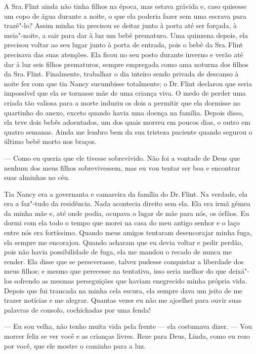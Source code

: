 A Sra.\,Flint ainda não tinha filhos na
época, mas estava grávida e, caso quisesse um copo de água durante a
noite, o que ela poderia fazer sem uma escrava para trazê"-lo? Assim
minha tia precisou se deitar junto à porta até ser forçada, à
meia"-noite, a sair para dar à luz um bebê prematuro. Uma quinzena
depois, ela precisou voltar ao seu lugar junto à porta de entrada, pois
o bebê da Sra.\,Flint precisava das suas atenções. Ela ficou no seu posto
durante inverno e verão até dar à luz seis filhos prematuros, sempre
empregada como ama noturna dos filhos da Sra.\,Flint. Finalmente,
trabalhar o dia inteiro sendo privada de descanso à noite fez com que
tia Nancy sucumbisse totalmente; o Dr.\,Flint declarou que seria
impossível que ela se tornasse mãe de uma criança viva. O medo de perder
uma criada tão valiosa para a morte induziu os dois a permitir que ela
dormisse no quartinho do anexo, exceto quando havia uma doença na
família. Depois disso, ela teve dois bebês adoentados, um dos quais
morreu em poucos dias, o outro em quatro semanas. Ainda me lembro bem da
sua tristeza paciente quando segurou o último bebê morto nos braços.

--- Como eu queria que ele tivesse sobrevivido. Não foi a vontade de
Deus que nenhum dos meus filhos sobrevivessem, mas eu vou tentar ser boa
e encontrar suas alminhas no céu.

Tia Nancy era a governanta e camareira
da família do Dr.\,Flint. Na verdade, ela era a faz"-tudo da residência.
Nada acontecia direito sem ela. Ela era irmã gêmea da minha mãe e, até
onde podia, ocupava o lugar de mãe para nós, os órfãos. Eu dormi com ela
todo o tempo que morei na casa do meu antigo senhor e o laço entre nós
era fortíssimo. Quando meus amigos tentaram desencorajar minha fuga, ela
sempre me encorajou. Quando acharam que eu devia voltar e pedir perdão,
pois não havia possibilidade de fuga, ela me mandou o recado de nunca me
render. Ela disse que se perseverasse, talvez pudesse conquistar a
liberdade dos meus filhos; e mesmo que perecesse na tentativa, isso
seria melhor do que deixá"-los sofrendo as mesmas perseguições que haviam
enegrecido minha própria vida. Depois que fui trancada na minha cela
escura, ela sempre dava um jeito de me trazer notícias e me alegrar.
Quantas vezes eu não me ajoelhei para ouvir suas palavras de consolo,
cochichadas por uma fenda!

--- Eu sou velha, não tenho muita vida pela frente --- ela costumava
dizer. --- Vou morrer feliz se ver você e as crianças livres. Reze para
Deus, Linda, como eu rezo por você, que ele mostre o caminho para a luz.

